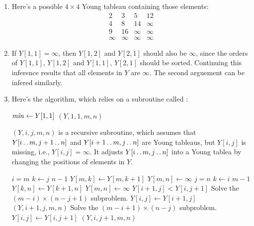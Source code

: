 \documentclass[a4paper, fleqn]{article}
\begin{document}
\begin{enumerate}
\renewcommand{\labelenumi}{\itshape \bfseries \alph{enumi}.}

\item  %
Here's a possible $4 \times 4$ Young tableau containing those elements:
\[
\begin{array}{cccc}
2 & 3 & 5 & 12 \\
4 & 8 & 14 & \infty \\
9 & 16 & \infty & \infty \\
\infty & \infty & \infty & \infty
\end{array}
\]



\item  %
If $Y[1,1] = \infty$, then $Y[1,2]$ and $Y[2,1]$ should also be $\infty$, since 
the orders of $Y[1,1]$, $Y[1,2]$ and $Y[1,1]$, $Y[2,1]$ should be sorted. Continuing 
this inference results that all elements in $Y$ are $\infty$. The second arguement 
can be infered similarly.

\item  %
Here's the  algorithm, which relies on a subroutine called 
:
\begin{codebox}
\li $\id{min} \gets Y[1,1]$
\li {}$(Y,1,1,m,n)$
\li \Return {}
\end{codebox}
$(Y,i,j,m,n)$ is a recursive subroutine, which assumes that \\ 
$Y[i \mathinner{\ldotp\ldotp} m, j+1 \mathinner{\ldotp\ldotp} n]$ and $Y[i+1 \mathinner{\ldotp\ldotp} m, j \mathinner{\ldotp\ldotp} n]$ are 
Young tableaus, but $Y[i,j]$ is missing, i.e., $Y[i,j] = \infty$. It adjusts 
$Y[i \mathinner{\ldotp\ldotp} m, j \mathinner{\ldotp\ldotp} n]$ into a Young tablea by changing the positions 
of elements in $Y$.
\begin{codebox}
\li \If $i = m$
\li     \Then
            \For $k \gets j$ \To $n-1$
\li             \Do
                    $Y[m,k] \gets Y[m,k+1]$
                \End
\li         $Y[m,n] \gets \infty$
\li         \Return
        \End
\li \If $j = n$
\li     \Then
            \For $k \gets i$ \To $m-1$
\li             \Do
                    $Y[k,n] \gets Y[k+1,n]$
                \End
\li         $Y[m,n] \gets \infty$
\li         \Return
        \End
\li \If $Y[i+1,j] < Y[i,j+1]$
\li     \Then
           \Comment Solve the $(m-i) \times (n-j+1)$ subproblem.
\li         $Y[i,j] \gets Y[i+1,j]$
\li         {}$(Y,i+1,j,m,n)$ 
\li     \Else
            \Comment Solve the $(m-i+1) \times (n-j)$ subproblem.
\li         $Y[i,j] \gets Y[i,j+1]$
\li         {}$(Y,i,j+1,m,n)$
        \End
\end{codebox}




\end{enumerate}
\end{document}
